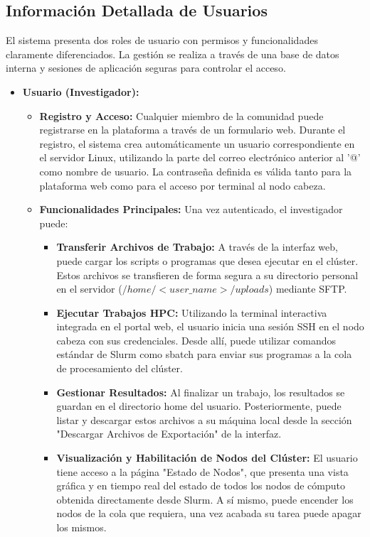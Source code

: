 \subsection{Información Detallada de Usuarios}
El sistema presenta dos roles de usuario con permisos y funcionalidades claramente diferenciados. La gestión se realiza a través de una base de datos interna y sesiones de aplicación seguras para controlar el acceso.
\begin{itemize}
    \item \textbf{Usuario (Investigador):} 
    \begin{itemize}
        \item \textbf{Registro y Acceso:} Cualquier miembro de la comunidad puede registrarse en la plataforma a través de un formulario web.  Durante el registro, el sistema crea automáticamente un usuario correspondiente en el servidor Linux, utilizando la parte del correo electrónico anterior al '@' como nombre de usuario. La contraseña definida es válida tanto para la plataforma web como para el acceso por terminal al nodo cabeza.
        \item \textbf{Funcionalidades Principales:} Una vez autenticado, el investigador puede:
        \begin{itemize}
            \item \textbf{Transferir Archivos de Trabajo:} A través de la interfaz web, puede cargar los scripts o programas que desea ejecutar en el clúster.  Estos archivos se transfieren de forma segura a su directorio personal en el servidor ($/home/<user\_name>/uploads$) mediante SFTP.
            \item \textbf{Ejecutar Trabajos HPC:} Utilizando la terminal interactiva integrada en el portal web, el usuario inicia una sesión SSH en el nodo cabeza con sus credenciales. Desde allí, puede utilizar comandos estándar de Slurm como sbatch para enviar sus programas a la cola de procesamiento del clúster.
            \item \textbf{Gestionar Resultados:} Al finalizar un trabajo, los resultados se guardan en el directorio home del usuario. Posteriormente, puede listar y descargar estos archivos a su máquina local desde la sección "Descargar Archivos de Exportación" de la interfaz.
            \item \textbf{Visualización y Habilitación de Nodos del Clúster:} El usuario tiene acceso a la página "Estado de Nodos", que presenta una vista gráfica y en tiempo real del estado de todos los nodos de cómputo obtenida directamente desde Slurm. A sí mismo, puede encender los nodos de la cola que requiera, una vez acabada su tarea puede apagar los mismos.
        \end{itemize}
    \end{itemize}


\end{itemize}
